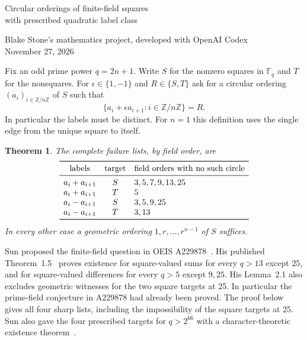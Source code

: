 \documentclass[11pt]{article}
\newtheorem{theorem}{Theorem}
\newcommand{\F}{\mathbb F}
\begin{document}
\begin{center}
{\LARGE Circular orderings of finite-field squares\\[3pt]with prescribed quadratic label class}\par\medskip
Blake Stone's mathematics project, developed with OpenAI Codex\\November 27, 2026
\end{center}
\begin{abstract}
For every odd finite field we determine whether its nonzero squares admit a circular ordering in which the consecutive sums or differences run through a prescribed quadratic class. For field orders greater than thirteen, the only failures are at order twenty-five, for both square-valued targets. At that field there is no twelve-vertex path with distinct square-valued labels, even before it is closed into a cycle. This settles the exceptional field omitted from Sun's square-target theorem and identifies the precise obstruction to the finite-field formulation in OEIS A229878. A Jacobi-sum bound reduces all four classifications to fields of order at most 1025. The finite obstruction at 25 has an independent Lean certificate.
\end{abstract}

Fix an odd prime power $q=2n+1$. Write $S$ for the nonzero squares in $\F_q$ and $T$ for the nonsquares. For $\epsilon\in\{1,-1\}$ and $R\in\{S,T\}$ ask for a circular ordering $(a_i)_{i\in\mathbb Z/n\mathbb Z}$ of $S$ such that
\[
 \{a_i+\epsilon a_{i+1}:i\in\mathbb Z/n\mathbb Z\}=R.
\]
In particular the labels must be distinct. For $n=1$ this definition uses the single edge from the unique square to itself.

\begin{theorem}\label{T}
The complete failure lists, by field order, are
\[
\begin{array}{ccl}
\toprule
\text{labels}&\text{target}&\text{field orders with no such circle}\\\midrule
a_i+a_{i+1}& S&3,5,7,9,13,25\\
a_i+a_{i+1}& T&5\\
a_i-a_{i+1}& S&3,5,9,25\\
a_i-a_{i+1}& T&3,13\\\bottomrule
\end{array}
\]
In every other case a geometric ordering $1,r,\ldots,r^{n-1}$ of $S$ suffices.
\end{theorem}

Sun proposed the finite-field question in OEIS A229878~\cite{OEIS}. His published Theorem~1.5~\cite{Sun} proves existence for square-valued sums for every $q>13$ except $25$, and for square-valued differences for every $q>5$ except $9,25$. His Lemma~2.1 also excludes geometric witnesses for the two square targets at 25. In particular the prime-field conjecture in A229878 had already been proved. The proof below gives all four sharp lists, including the impossibility of the square targets at 25. Sun also gave the four prescribed targets for $q>2^{66}$ with a character-theoretic existence theorem~\cite[slides 12--13]{Graz}.
\end{document}
